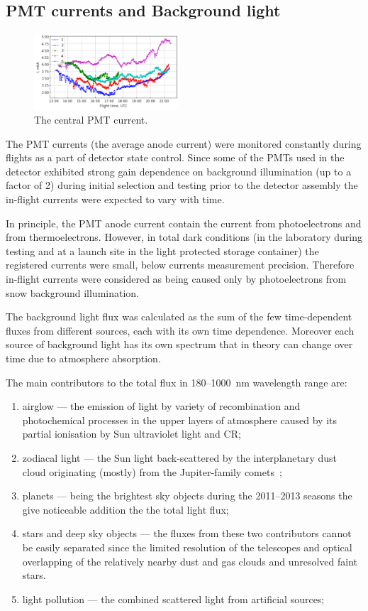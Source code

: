 \documentclass[final,5p,times,twocolumn]{elsarticle}
\begin{document}
\subsection{PMT currents and Background light}

\begin{figure}[tb]
    \includegraphics[width=0.48\textwidth]{figs/cur2013_PMT1}
    \caption{The central PMT current.}
\label{fig:current}
\end{figure}

The PMT currents (the average anode current) were monitored constantly during flights as a part of detector state control. Since some of the PMTs used in the detector exhibited strong gain dependence on background illumination (up to a factor of 2) during initial selection and testing prior to the detector assembly the in-flight currents were expected to vary with time.

In principle, the PMT anode current contain the current from photoelectrons and from thermoelectrons. However, in total dark conditions (in the laboratory during testing and at a launch site in the light protected storage container) the registered currents were small, below currents measurement precision. Therefore in-flight currents were considered as being caused only by photoelectrons from snow background illumination.

The background light flux was calculated as the sum of the few time-dependent fluxes from different sources, each with its own time dependence. Moreover each source of background light has its own spectrum that in theory can change over time due to atmosphere absorption.

The main contributors to the total flux in 180--1000~nm wavelength range are:
\begin{enumerate}
    \item airglow --- the emission of light by variety of recombination and photochemical processes in the upper layers of atmosphere caused by its partial ionisation by Sun ultraviolet light and CR;
    \item zodiacal light --- the Sun light back-scattered by the interplanetary dust cloud originating (mostly) from the Jupiter-family comets~\cite{Nesvorn__2010};
    \item planets --- being the brightest sky objects during the 2011--2013 seasons the give noticeable addition the the total light flux;
    \item stars and deep sky objects --- the fluxes from these two contributors cannot be easily separated since the limited resolution of the telescopes and optical overlapping of the relatively nearby dust and gas clouds and unresolved faint stars.
    \item light pollution --- the combined scattered light from artificial sources;
\end{enumerate}
\end{document}
